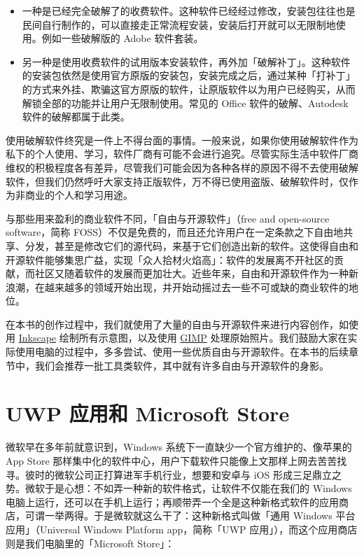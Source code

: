 {{\begin{itemize}
  \item 一种是已经完全破解了的收费软件。这种软件已经经过修改，安装包往往也是民间自行制作的，可以直接走正常流程安装，安装后打开就可以无限制地使用。例如一些破解版的 Adobe 软件套装。
\end{itemize}

\begin{itemize}
  \item 另一种是使用收费软件的试用版本安装软件，再外加「破解补丁」。这种软件的安装包依然是使用官方原版的安装包，安装完成之后，通过某种「打补丁」的方式来外挂、欺骗这官方原版的软件，让原版软件以为用户已经购买，从而解锁全部的功能并让用户无限制使用。常见的 Office 软件的破解、Autodesk 软件的破解都属于此类。
\end{itemize}

使用破解软件终究是一件上不得台面的事情。一般来说，如果你使用破解软件作为私下的个人使用、学习，软件厂商有可能不会进行追究。尽管实际生活中软件厂商维权的积极程度各有差异，尽管我们可能会因为各种各样的原因不得不去使用破解软件，但我们仍然呼吁大家支持正版软件，万不得已使用盗版、破解软件时，仅作为非商业的个人和学习用途。

与那些用来盈利的商业软件不同，「自由与开源软件」（free and open-source software，简称 FOSS）不仅是免费的，而且还允许用户在一定条款之下自由地共享、分发，甚至是修改它们的源代码，来基于它们创造出新的软件。这使得自由和开源软件能够集思广益，实现「众人拾材火焰高」：软件的发展离不开社区的贡献，而社区又随着软件的发展而更加壮大。近些年来，自由和开源软件作为一种新浪潮，在越来越多的领域开始出现，并开始动摇过去一些不可或缺的商业软件的地位。

在本书的创作过程中，我们就使用了大量的自由与开源软件来进行内容创作，如使用 \href{https://inkscape.org/}{Inkscape} 绘制所有示意图，以及使用 \href{https://www.gimp.org/}{GIMP} 处理原始照片。我们鼓励大家在实际使用电脑的过程中，多多尝试、使用一些优质自由与开源软件。在本书的后续章节中，我们会推荐一批工具类软件，其中就有许多自由与开源软件的身影。

\section{UWP 应用和 Microsoft Store}

微软早在多年前就意识到，Windows 系统下一直缺少一个官方维护的、像苹果的 App Store 那样集中化的软件中心，用户下载软件只能像上文那样上网去苦苦找寻。彼时的微软公司正打算进军手机行业，想要和安卓与 iOS 形成三足鼎立之势。微软于是心想：不如弄一种新的软件格式，让软件不仅能在我们的 Windows 电脑上运行，还可以在手机上运行；再顺带弄一个全是这种新格式软件的应用商店，可谓一举两得。于是微软就这么干了：这种新格式叫做「通用 Windows 平台应用」（Universal Windows Platform app，简称「UWP 应用」），而这个应用商店则是我们电脑里的「Microsoft Store」：

}}
